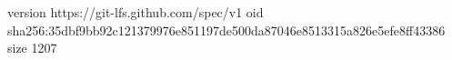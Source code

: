 version https://git-lfs.github.com/spec/v1
oid sha256:35dbf9bb92c121379976e851197de500da87046e8513315a826e5efe8ff43386
size 1207
